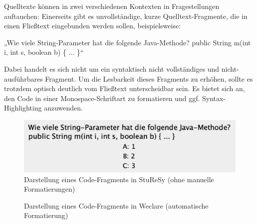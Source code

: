 Quelltexte können in zwei verschiedenen Kontexten in Fragestellungen auftauchen: Einerseits gibt es unvollständige, kurze Quelltext-Fragmente, die in einen Fließtext eingebunden werden sollen, beispielsweise:

\begin{center}
„Wie viele String-Parameter hat die folgende Java-Methode?\newline
public String m(int i, int s, boolean b) \{ ... \}“
\end{center}

Dabei handelt es sich nicht um ein syntaktisch nicht vollständiges und nicht-ausführbares Fragment. Um die Lesbarkeit dieses Fragments zu erhöhen, sollte es trotzdem optisch deutlich vom Fließtext unterscheidbar sein. Es bietet sich an, den Code in einer Monospace-Schriftart zu formatieren und ggf. Syntax-Highlighting anzuwenden.

\begin{figure}[H]
    \centering
    \includegraphics[width=\textwidth,frame]{chapter/entwurf/bilder/sturesy_fragment.png}
    \caption{Darstellung eines Code-Fragments in StuReSy (ohne manuelle Formatierungen)}
    \label{abb:sturesy_code_fragment}
\end{figure}


\begin{figure}[H]
    \centering
    \caption{Darstellung eines Code-Fragments in Weclare (automatische Formatierung)}
    \label{abb:weclare_code_fragment}
\end{figure}


